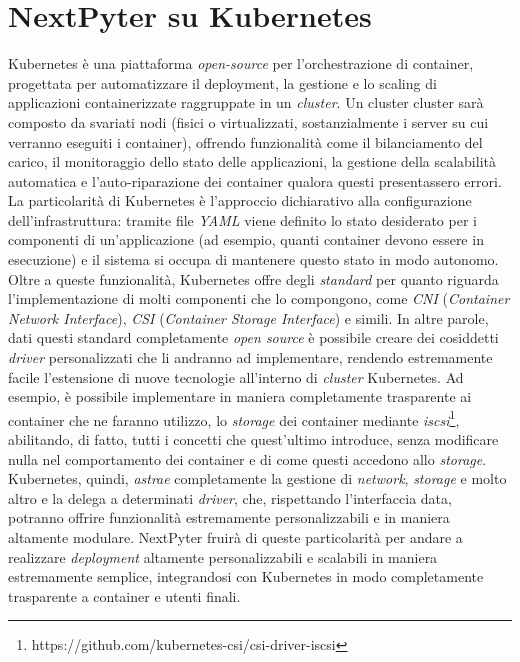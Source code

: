 \section{NextPyter su Kubernetes}
Kubernetes è una piattaforma \textit{open-source} per l'orchestrazione di container, progettata per automatizzare il deployment, la gestione e lo scaling di applicazioni containerizzate raggruppate in un \textit{cluster}. Un cluster cluster sarà composto da svariati nodi (fisici o virtualizzati, sostanzialmente i server su cui verranno eseguiti i container), offrendo funzionalità come il bilanciamento del carico, il monitoraggio dello stato delle applicazioni, la gestione della scalabilità automatica e l'auto-riparazione dei container qualora questi presentassero errori. La particolarità di Kubernetes è l'approccio dichiarativo alla configurazione dell'infrastruttura: tramite file \textit{YAML} viene definito lo stato desiderato per i componenti di un'applicazione (ad esempio, quanti container devono essere in esecuzione) e il sistema si occupa di mantenere questo stato in modo autonomo. 
\newline
\newline
Oltre a queste funzionalità, Kubernetes offre degli \textit{standard} per quanto riguarda l'implementazione di molti componenti che lo compongono, come \textit{CNI} (\textit{Container Network Interface}), \textit{CSI} (\textit{Container Storage Interface}) e simili.
\newline
In altre parole, dati questi standard completamente \textit{open source} è possibile creare dei cosiddetti \textit{driver} personalizzati che li andranno ad implementare, rendendo estremamente facile l'estensione di nuove tecnologie all'interno di \textit{cluster} Kubernetes. Ad esempio, è possibile implementare in maniera completamente trasparente ai container che ne faranno utilizzo, lo \textit{storage} dei container mediante \textit{iscsi}\footnote{https://github.com/kubernetes-csi/csi-driver-iscsi}, abilitando, di fatto, tutti i concetti che quest'ultimo introduce, senza modificare nulla nel comportamento dei container e di come questi accedono allo \textit{storage}. Kubernetes, quindi, \textit{astrae} completamente la gestione di \textit{network}, \textit{storage} e molto altro e la delega a determinati \textit{driver}, che, rispettando l'interfaccia data, potranno offrire funzionalità estremamente personalizzabili e in maniera altamente modulare.
\newline
NextPyter fruirà di queste particolarità per andare a realizzare \textit{deployment} altamente personalizzabili e scalabili in maniera estremamente semplice, integrandosi con Kubernetes in modo completamente trasparente a container e utenti finali.
\newpage

